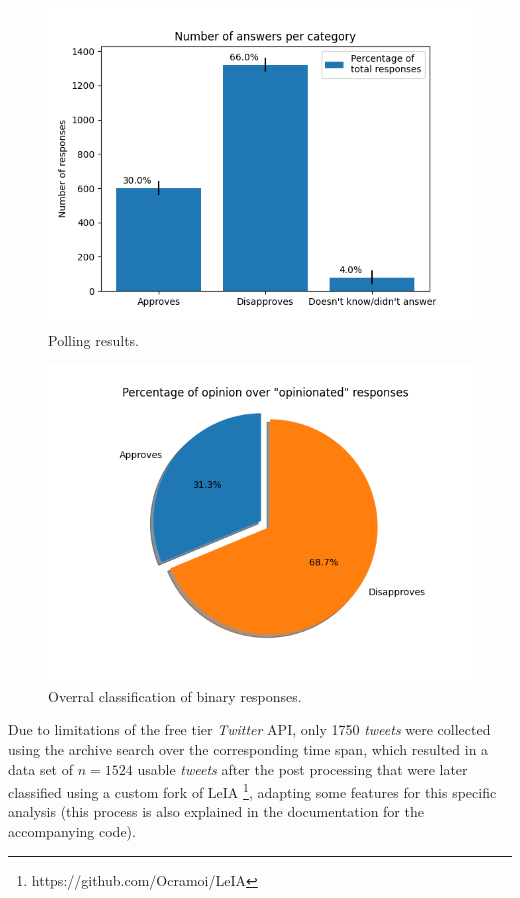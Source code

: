 \documentclass[conference]{IEEEtran}
\begin{document}
\begin{figure}[H]
\centering
\includegraphics[width=\linewidth]{./ValsIPEC.png}
\caption{\label{fig:polls}Polling results.}
\end{figure}

\begin{figure}[H]
\centering
\includegraphics[width=\linewidth]{./piePoll.png}
\caption{\label{fig:nonneutral}Overral classification of binary responses.}
\end{figure}

Due to limitations of the free tier \emph{Twitter} API, only 1750 \emph{tweets} were collected using the archive search over the corresponding time span, which resulted in a data set of \(n = 1524\) usable \emph{tweets} after the post processing that were later classified using a custom fork of LeIA \footnote{https://github.com/Ocramoi/LeIA}, adapting some features for this specific analysis (this process is also explained in the documentation for the accompanying code).
\end{document}
